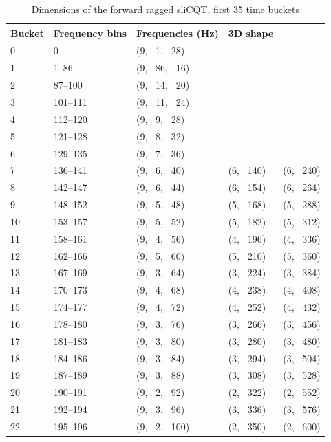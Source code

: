 \documentclass[report.tex]{subfiles}
\begin{document}
\begin{table}[ht]
	\centering
	\caption{Dimensions of the forward ragged sliCQT, first 35 time buckets}
	\label{table:slicqdim1}
	\begin{tabular}{ |l|l|l|l|l| }
	 \hline
		Bucket & Frequency bins & Frequencies (Hz) &  3D shape \\
	 \hline
	 \hline
0 & 0 & (9, \ 1, \ 28) \\
\hline
1 & 1--86 & (9, \ 86, \ 16) \\
\hline
2 & 87--100 & (9, \ 14, \ 20) \\
\hline
3 & 101--111 & (9, \ 11, \ 24) \\
\hline
4 & 112--120 & (9, \ 9, \ 28) \\
\hline
5 & 121--128 & (9, \ 8, \ 32) \\
\hline
6 & 129--135 & (9, \ 7, \ 36) \\
\hline
7 & 136--141 & (9, \ 6, \ 40) & (6, \ 140) & (6, \ 240) \\
\hline
8 & 142--147 & (9, \ 6, \ 44) & (6, \ 154) & (6, \ 264) \\
\hline
9 & 148--152 & (9, \ 5, \ 48) & (5, \ 168) & (5, \ 288) \\
\hline
10 & 153--157 & (9, \ 5, \ 52) & (5, \ 182) & (5, \ 312) \\
\hline
11 & 158--161 & (9, \ 4, \ 56) & (4, \ 196) & (4, \ 336) \\
\hline
12 & 162--166 & (9, \ 5, \ 60) & (5, \ 210) & (5, \ 360) \\
\hline
13 & 167--169 & (9, \ 3, \ 64) & (3, \ 224) & (3, \ 384) \\
\hline
14 & 170--173 & (9, \ 4, \ 68) & (4, \ 238) & (4, \ 408) \\
\hline
15 & 174--177 & (9, \ 4, \ 72) & (4, \ 252) & (4, \ 432) \\
\hline
16 & 178--180 & (9, \ 3, \ 76) & (3, \ 266) & (3, \ 456) \\
\hline
17 & 181--183 & (9, \ 3, \ 80) & (3, \ 280) & (3, \ 480) \\
\hline
18 & 184--186 & (9, \ 3, \ 84) & (3, \ 294) & (3, \ 504) \\
\hline
19 & 187--189 & (9, \ 3, \ 88) & (3, \ 308) & (3, \ 528) \\
\hline
20 & 190--191 & (9, \ 2, \ 92) & (2, \ 322) & (2, \ 552) \\
\hline
21 & 192--194 & (9, \ 3, \ 96) & (3, \ 336) & (3, \ 576) \\
\hline
22 & 195--196 & (9, \ 2, \ 100) & (2, \ 350) & (2, \ 600) \\

\end{tabular}
\end{table}
\end{document}
